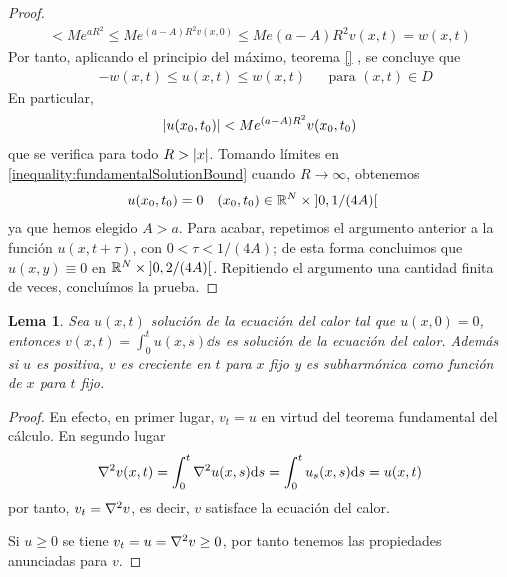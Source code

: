 \documentclass{article}
\newcommand{\realNumbers}{\mathbb{R}}
\newtheorem{lemma}{Lema}
\theoremstyle{definition}
\theoremstyle{remark}
\newcommand{\leftOpenInterval}{\left]}
\newcommand{\rightOpenInterval}{\right[}
\newcommand{\leftClosedInterval}{\left[}
\newcommand{\rightClosedInterval}{\right]}
\newcommand{\interval}[3]{%
  \ifstrequal{#1}{oo}{%
    \leftOpenInterval #2, #3 \rightOpenInterval%
  }{%
    \ifstrequal{#1}{co}{%
      \leftClosedInterval #2, #3 \rightOpenInterval%
    }{%
      \ifstrequal{#1}{oc}{
        \leftOpenInterval #2, #3 \rightClosedInterval%
      }{%
        \ifstrequal{#1}{cc}{
          \leftClosedInterval #2, #3 \rightClosedInterval
        }{%
        }%
      }%
    }%
  }%
}
\begin{document}
\begin{proof}
\begin{align}
      <
      M e^{a R^2}
      \leq
      M e^{(a - A) R^2 v(x, 0)}
      \leq
      M e {(a - A) R^2} v(x, t)
      =
      w(x, t)
    \end{align}
    Por tanto, aplicando el principio del máximo, teorema 
    \ref{}  %
    , se concluye que
    \begin{align}
      &- w(x, t) \leq u(x, t) \leq w(x, t)
      && \text{para } (x, t) \in D
    \end{align}
    En particular,
    \begin{align}
      \label{inequality:fundamentalSolutionBound}
      \abs{u(x_0, t_0)}
      <
      M e^{(a - A) R^2} v(x_0, t_0)
    \end{align}
    que se verifica para todo \(R > \abs{x}\).
    Tomando límites en \ref{inequality:fundamentalSolutionBound} cuando \(R \rightarrow \infty\), obtenemos
    \begin{align}
      &u(x_0, t_0) = 0
      && (x_0, t_0) \in \realNumbers^N \times \interval{oo}{0}{1 / (4 A)}
    \end{align}
    ya que hemos elegido \(A > a\).
    Para acabar, repetimos el argumento anterior a la función \(u(x, t + \tau)\), con \(0 < \tau < 1 / (4 A)\);
    de esta forma concluimos que \(u(x, y) \equiv 0\) en \(\realNumbers^N \times \interval{oo}{0}{ 2 / (4 A)}\).
    Repitiendo el argumento una cantidad finita de veces, concluímos la prueba.
  \end{proof}

  \begin{lemma} %
    Sea \(u(x, t)\) solución de la ecuación del calor tal que \(u(x,0) = 0\), entonces \(v(x, t) = \int_0^t u(x, s) \dd s\) es solución de la ecuación del calor.
    Además si \(u\) es positiva, \(v\) es creciente en \(t\) para \(x\) fijo y es subharmónica como función de \(x\) para \(t\) fijo.
  \end{lemma}
  \begin{proof}
    En efecto, en primer lugar, \(v_t = u\) en virtud del teorema fundamental del cálculo.
    En segundo lugar
    \begin{align}
      \laplacian v (x , t)
      =
      \int_0^t \laplacian u (x, s) \dd s
      =
      \int_0^t u_s(x, s) \dd s
      =
      u(x, t)
    \end{align}
    por tanto, \(v_t = \laplacian v\), es decir, \(v\) satisface la ecuación del calor.

    Si \(u \geq 0\) se tiene \(v_t = u = \laplacian v \geq 0\), por tanto tenemos las propiedades anunciadas para \(v\).
  \end{proof}
\end{document}
